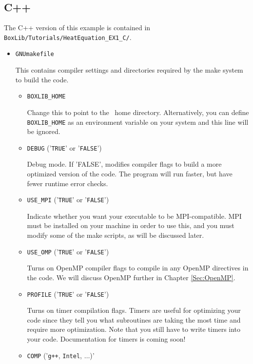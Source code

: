 \subsection{C++}
The C++ version of this example is contained in {\tt BoxLib/Tutorials/HeatEquation\_EX1\_C/}.

\begin{itemize}
\item {\tt GNUmakefile}

This contains compiler settings and directories required by the make system to build the code.

  \begin{itemize}

    \item {\tt BOXLIB\_HOME}

    Change this to point to the \BoxLib\ home directory.  Alternatively, you can define {\tt BOXLIB\_HOME}
    as an environment variable on your system and this line will be ignored.

    \item {\tt DEBUG} ('{\tt TRUE}' or '{\tt FALSE}')
      
    Debug mode.  If 'FALSE', modifies compiler flags to build a more optimized version of the code.
    The program will run faster, but have fewer runtime error checks.

    \item {\tt USE\_MPI} ('{\tt TRUE}' or '{\tt FALSE}')

    Indicate whether you want your executable to be MPI-compatible.  MPI must be installed on your
    machine in order to use this, and you must modify some of the make scripts, as will be 
    discussed later.

    \item {\tt USE\_OMP} ('{\tt TRUE}' or '{\tt FALSE}')
    
    Turns on OpenMP compiler flags to compile in any OpenMP directives in the code.
    We will discuss OpenMP further in Chapter \ref{Sec:OpenMP}.

    \item {\tt PROFILE} ('{\tt TRUE}' or '{\tt FALSE}')

    Turns on timer compilation flags.  Timers are useful for optimizing your code since they tell you 
    what subroutines are taking the most time and require more optimization.  Note that you still have 
    to write timers into your code.  Documentation for timers is coming soon!

    \item {\tt COMP} ('{\tt g++}, {\tt Intel}, $\ldots$)'


\end{itemize}
\end{itemize}
